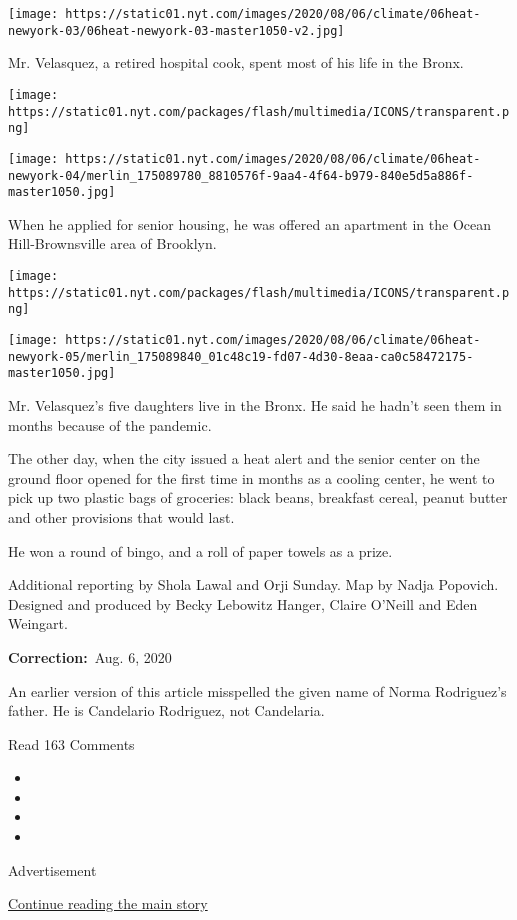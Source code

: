 \texttt{[image: https://static01.nyt.com/images/2020/08/06/climate/06heat-newyork-03/06heat-newyork-03-master1050-v2.jpg]}

Mr. Velasquez, a retired hospital cook, spent most of his life in the
Bronx.

\texttt{[image: https://static01.nyt.com/packages/flash/multimedia/ICONS/transparent.png]}

\texttt{[image: https://static01.nyt.com/images/2020/08/06/climate/06heat-newyork-04/merlin\_175089780\_8810576f-9aa4-4f64-b979-840e5d5a886f-master1050.jpg]}

When he applied for senior housing, he was offered an apartment in the
Ocean Hill-Brownsville area of Brooklyn.

\texttt{[image: https://static01.nyt.com/packages/flash/multimedia/ICONS/transparent.png]}

\texttt{[image: https://static01.nyt.com/images/2020/08/06/climate/06heat-newyork-05/merlin\_175089840\_01c48c19-fd07-4d30-8eaa-ca0c58472175-master1050.jpg]}

Mr. Velasquez's five daughters live in the Bronx. He said he hadn't seen
them in months because of the pandemic.

The other day, when the city issued a heat alert and the senior center
on the ground floor opened for the first time in months as a cooling
center, he went to pick up two plastic bags of groceries: black beans,
breakfast cereal, peanut butter and other provisions that would last.

He won a round of bingo, and a roll of paper towels as a prize.

Additional reporting by Shola Lawal and Orji Sunday. Map by Nadja
Popovich. Designed and produced by Becky Lebowitz Hanger, Claire O'Neill
and Eden Weingart.

\textbf{Correction:}~Aug. 6, 2020

An earlier version of this article misspelled the given name of Norma
Rodriguez's father. He is Candelario Rodriguez, not Candelaria.

Read 163 Comments

\begin{itemize}
\item
\item
\item
\item
\end{itemize}

Advertisement

\protect\hyperlink{after-bottom}{Continue reading the main story}

